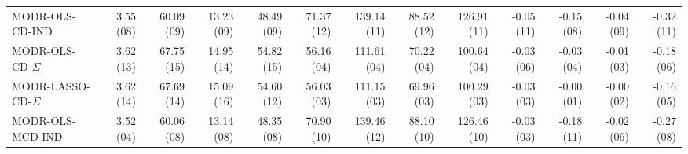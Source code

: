 \begin{tabular}{lrrrrrrrrrrrr}
MODR-OLS-CD-IND & {\cellcolor[HTML]{D9C5C5}} \color[HTML]{000000} 3.55 (08) & {\cellcolor[HTML]{D38E8E}} \color[HTML]{F1F1F1} 60.09 (09) & {\cellcolor[HTML]{D8B6B6}} \color[HTML]{000000} 13.23 (09) & {\cellcolor[HTML]{D38F8F}} \color[HTML]{F1F1F1} 48.49 (09) & {\cellcolor[HTML]{D7ADAD}} \color[HTML]{000000} 71.37 (12) & {\cellcolor[HTML]{DBD1D1}} \color[HTML]{000000} 139.14 (11) & {\cellcolor[HTML]{D7B1B1}} \color[HTML]{000000} 88.52 (12) & {\cellcolor[HTML]{DBD2D2}} \color[HTML]{000000} 126.91 (11) & {\cellcolor[HTML]{6EAEAE}} \color[HTML]{F1F1F1} -0.05 (11) & {\cellcolor[HTML]{D7AFAF}} \color[HTML]{000000} -0.15 (08) & {\cellcolor[HTML]{D9C5C5}} \color[HTML]{000000} -0.04 (09) & {\cellcolor[HTML]{DBD3D3}} \color[HTML]{000000} -0.32 (11) \\
MODR-OLS-CD-$\Sigma$ & {\cellcolor[HTML]{D28989}} \color[HTML]{F1F1F1} 3.62 (13) & {\cellcolor[HTML]{CD6060}} \color[HTML]{F1F1F1} 67.75 (15) & {\cellcolor[HTML]{CE6262}} \color[HTML]{F1F1F1} 14.95 (14) & {\cellcolor[HTML]{CE6363}} \color[HTML]{F1F1F1} 54.82 (15) & {\cellcolor[HTML]{118787}} \color[HTML]{F1F1F1} 56.16 (04) & {\cellcolor[HTML]{0C8585}} \color[HTML]{F1F1F1} 111.61 (04) & {\cellcolor[HTML]{118787}} \color[HTML]{F1F1F1} 70.22 (04) & {\cellcolor[HTML]{108686}} \color[HTML]{F1F1F1} 100.64 (04) & {\cellcolor[HTML]{379797}} \color[HTML]{F1F1F1} -0.03 (06) & {\cellcolor[HTML]{A6C5C5}} \color[HTML]{000000} -0.03 (04) & {\cellcolor[HTML]{9AC0C0}} \color[HTML]{000000} -0.01 (03) & {\cellcolor[HTML]{72B0B0}} \color[HTML]{F1F1F1} -0.18 (06) \\
MODR-LASSO-CD-$\Sigma$ & {\cellcolor[HTML]{D28989}} \color[HTML]{F1F1F1} 3.62 (14) & {\cellcolor[HTML]{CE6161}} \color[HTML]{F1F1F1} 67.69 (14) & {\cellcolor[HTML]{CD5C5C}} \color[HTML]{F1F1F1} 15.09 (16) & {\cellcolor[HTML]{CE6565}} \color[HTML]{F1F1F1} 54.60 (12) & {\cellcolor[HTML]{0E8686}} \color[HTML]{F1F1F1} 56.03 (03) & {\cellcolor[HTML]{078383}} \color[HTML]{F1F1F1} 111.15 (03) & {\cellcolor[HTML]{0C8585}} \color[HTML]{F1F1F1} 69.96 (03) & {\cellcolor[HTML]{0E8686}} \color[HTML]{F1F1F1} 100.29 (03) & {\cellcolor[HTML]{1D8C8C}} \color[HTML]{F1F1F1} -0.03 (03) & {\cellcolor[HTML]{008080}} \color[HTML]{F1F1F1} -0.00 (01) & {\cellcolor[HTML]{61A8A8}} \color[HTML]{F1F1F1} -0.00 (02) & {\cellcolor[HTML]{5FA8A8}} \color[HTML]{F1F1F1} -0.16 (05) \\
MODR-OLS-MCD-IND & {\cellcolor[HTML]{DBDCDC}} \color[HTML]{000000} 3.52 (04) & {\cellcolor[HTML]{D38E8E}} \color[HTML]{F1F1F1} 60.06 (08) & {\cellcolor[HTML]{D8BBBB}} \color[HTML]{000000} 13.14 (08) & {\cellcolor[HTML]{D39090}} \color[HTML]{F1F1F1} 48.35 (08) & {\cellcolor[HTML]{D7B2B2}} \color[HTML]{000000} 70.90 (10) & {\cellcolor[HTML]{DBD0D0}} \color[HTML]{000000} 139.46 (12) & {\cellcolor[HTML]{D7B4B4}} \color[HTML]{000000} 88.10 (10) & {\cellcolor[HTML]{DBD4D4}} \color[HTML]{000000} 126.46 (10) & {\cellcolor[HTML]{1D8C8C}} \color[HTML]{F1F1F1} -0.03 (03) & {\cellcolor[HTML]{D5A4A4}} \color[HTML]{000000} -0.18 (11) & {\cellcolor[HTML]{CFD7D7}} \color[HTML]{000000} -0.02 (06) & {\cellcolor[HTML]{C8D4D4}} \color[HTML]{000000} -0.27 (08) \\

\end{tabular}
